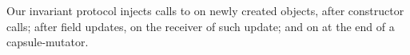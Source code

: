 Our invariant protocol injects calls to \Q@invariant@
 on newly created objects, after constructor calls;
 after field updates, on the receiver of such update;
 and on \Q@this@ at the end of a capsule-mutator.












